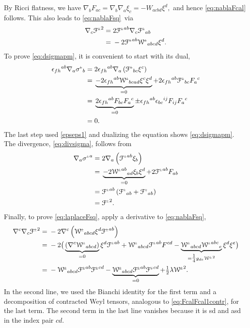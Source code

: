 \documentclass[a4paper,10pt,reqno]{amsart}
\theoremstyle{plain}
\newcommand{\PM}[1]{{{#1}^{\hspace{-.5pt}\scaleto{\pm}{3.5pt}}}}
\newcommand{\MP}[1]{{{#1}^{\hspace{-.5pt}\scaleto{\mp}{3.5pt}}}}
\def\Wcal{\mathcal{W}}
\def\Fcal{\mathcal{F}}
\numberwithin{equation}{section}
\begin{document}
By Ricci flatness, we have $\nabla_{b} F_{ac} = \nabla_{b}\nabla_{a}\xi_{c} = - W_{acbd} \xi^{d}, $ and hence \eqref{eq:nablaFcal} follows. This also leads to \eqref{eq:nablaFsq}\ via
\begin{align*}
\nabla_{c}\PM{\Fcal}^2
={}&2 \PM{\Fcal}^{ab}\nabla_{c}\PM{\Fcal}_{ab} \\
={}&- 2 \PM{\Fcal}^{ab}\PM{\Wcal}_{abcd} \xi^{d}.
\end{align*}
To prove \eqref{eq:dsigmapm}, it is convenient to start with its dual,
\begin{align*}
\epsilon_{fh}{}^{ab} \nabla_{a}\PM{\sigma}_{b} 
={}& 2\epsilon_{fh}{}^{ab} \nabla_{a}\left( \PM{\Fcal}_{bc}\xi^c \right) \\
={}& \underbrace{ -2 \epsilon_{fh}{}^{ab}\PM{\Wcal}_{bcad}\xi^c \xi^d}_{=0} + 2\epsilon_{fh}{}^{ab}\PM{\Fcal}_{bc} F_a{}^c \\
={}&  \underbrace{ 2 \epsilon_{fh}{}^{ab}  F_{bc} F_a{}^c}_{=0}  \pm \epsilon_{fh}{}^{ab}  \epsilon_{bc}{}^{ij} F_{ij}  F_a{}^c \\
={}& 0.
\end{align*}
The last step used \eqref{epseps1} and dualizing the equation shows \eqref{eq:dsigmapm}. The divergence, \eqref{eq:divsigma}, follows from
\begin{align*}
\nabla_{a}\PM{\sigma}^{a}
={}& 2 \nabla_{a} \left( \PM{\Fcal}^{ab}\xi_{b}\right)\\
={}& \underbrace{-2\PM{\Wcal}^{ab}{}_{ad}\xi_{b}\xi^d}_{=0} +  2\PM{\Fcal}^{ab} F_{ab} \\
={}& \PM{\Fcal}^{ab} \left( \PM{\Fcal}_{ab} + \MP{\Fcal}_{ab} \right) \\
={}&\PM{\Fcal}^2.
\end{align*}
Finally, to prove \eqref{eq:laplaceFsq}, apply a derivative to \eqref{eq:nablaFsq},
\begin{align*}
\nabla^{c}\nabla_{c}\PM{\Fcal}^2
={}&-2 \nabla^{c} \left( \PM{\Wcal}_{abcd} \xi^{d}\PM{\Fcal}^{ab} \right) \\
={}& -2 \big( \underbrace{(\nabla^{c} \PM{\Wcal}_{abcd})}_{=0} \xi^{d}\PM{\Fcal}^{ab} +\PM{\Wcal}_{abcd} \PM{\Fcal}^{ab} F^{cd}  - \underbrace{\PM{\Wcal}_{abcd}  \PM{\Wcal}^{abc}{}_{e}}_{= \tfrac{1}{4} g_{de}\PM{\Wcal}^2} \xi^{d} \xi^e \big) \\
={}& - \PM{\Wcal}_{abcd} \PM{\Fcal}^{ab}  \PM{\Fcal}^{cd} - \underbrace{\PM{\Wcal}_{abcd} \PM{\Fcal}^{ab}  \MP{\Fcal}^{cd}}_{=0} +\tfrac{1}{2} \lambda \PM{\Wcal}^2.
\end{align*}
In the second line, we used the Bianchi identity for the first term and a decomposition of contracted Weyl tensors, analogous to \eqref{eq:FcalFcal1contr}, for the last term. The second term in the last line vanishes because it is sd and asd in the index pair $cd$.
%
\end{document}
